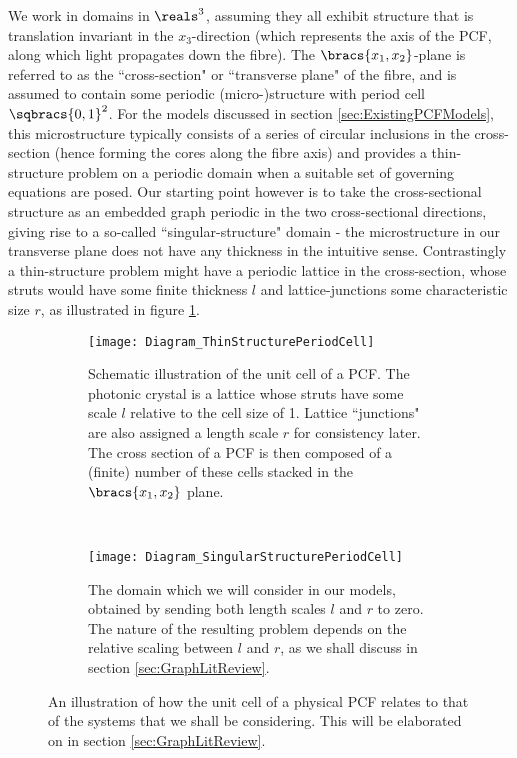 We work in domains in $\reals^3$, assuming they all exhibit structure that is translation invariant in the $x_3$-direction (which represents the axis of the PCF, along which light propagates down the fibre).
The $\bracs{x_1,x_2}$-plane is referred to as the ``cross-section" or ``transverse plane" of the fibre, and is assumed to contain some periodic (micro-)structure with period cell $\sqbracs{0,1}^2$.
For the models discussed in section \ref{sec:ExistingPCFModels}, this microstructure typically consists of a series of circular inclusions in the cross-section (hence forming the cores along the fibre axis) and provides a thin-structure problem on a periodic domain when a suitable set of governing equations are posed.
Our starting point however is to take the cross-sectional structure as an embedded graph periodic in the two cross-sectional directions, giving rise to a so-called ``singular-structure" domain - the microstructure in our transverse plane does not have any thickness in the intuitive sense.
Contrastingly a thin-structure problem might have a periodic lattice in the cross-section, whose struts would have some finite thickness $l$ and lattice-junctions some characteristic size $r$, as illustrated in figure \ref{fig:Diagram_ThinStructurePeriodCell}.
\begin{figure}[b!]
	\centering
	\begin{subfigure}[t]{0.45\textwidth}
		\centering
		\texttt{[image: Diagram\_ThinStructurePeriodCell]}
		\caption{\label{fig:Diagram_ThinStructurePeriodCell} Schematic illustration of the unit cell of a PCF. The photonic crystal is a lattice whose struts have some scale $l$ relative to the cell size of 1. Lattice ``junctions" are also assigned a length scale $r$ for consistency later. The cross section of a PCF is then composed of a (finite) number of these cells stacked in the $\bracs{x_1,x_2}$ plane.}
	\end{subfigure}
	~
	\begin{subfigure}[t]{0.45\textwidth}
		\centering
		\texttt{[image: Diagram\_SingularStructurePeriodCell]}
		\caption{\label{fig:Diagram_SingularStructurePeriodCell} The domain which we will consider in our models, obtained by sending both length scales $l$ and $r$ to zero. The nature of the resulting problem depends on the relative scaling between $l$ and $r$, as we shall discuss in section \ref{sec:GraphLitReview}.}
	\end{subfigure}
	\caption{\label{fig:ThinToSingularStructure} An illustration of how the unit cell of a physical PCF relates to that of the systems that we shall be considering. This will be elaborated on in section \ref{sec:GraphLitReview}.}
\end{figure}
